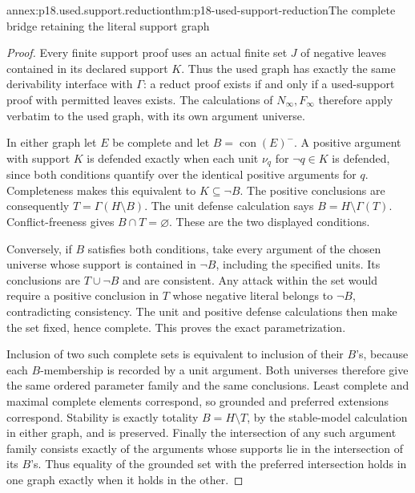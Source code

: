 \begin{annexitem}{annex:p18.used.support.reduction}{thm:p18-used-support-reduction}{The complete bridge retaining the literal support graph}
\begin{proof}
Every finite support proof uses an actual finite set \(J\)
of negative leaves contained in its declared support \(K\).
Thus the used graph has exactly the same derivability
interface with \(\Gamma\): a reduct proof exists if
and only if a used-support proof with permitted leaves
exists. The calculations of \(N_\infty,F_\infty\)
therefore apply verbatim to the used graph, with
its own argument universe.

In either graph let \(E\) be complete and let
\(B=\operatorname{con}(E)^-\). A positive argument
with support \(K\) is defended exactly when each
unit \(\nu_q\) for \(\neg q\in K\) is defended,
since both conditions quantify over the identical
positive arguments for \(q\). Completeness makes
this equivalent to \(K\subseteq\neg B\).
The positive conclusions are consequently
\(T=\Gamma(H\setminus B)\).
The unit defense calculation says
\(B=H\setminus\Gamma(T)\).
Conflict-freeness gives \(B\cap T=\varnothing\).
These are the two displayed conditions.

Conversely, if \(B\) satisfies both conditions,
take every argument of the chosen universe whose
support is contained in \(\neg B\), including
the specified units. Its conclusions are
\(T\cup\neg B\) and are consistent.
Any attack within the set would require a
positive conclusion in \(T\) whose negative
literal belongs to \(\neg B\), contradicting
consistency. The unit and positive defense
calculations then make the set fixed, hence
complete. This proves the exact parametrization.

Inclusion of two such complete sets is equivalent
to inclusion of their \(B\)'s, because each
\(B\)-membership is recorded by a unit argument.
Both universes therefore give the same ordered
parameter family and the same conclusions.
Least complete and maximal complete elements
correspond, so grounded and preferred extensions
correspond. Stability is exactly totality
\(B=H\setminus T\), by the stable-model
calculation in either graph, and is preserved.
Finally the intersection of any such argument
family consists exactly of the arguments whose
supports lie in the intersection of its \(B\)'s.
Thus equality of the grounded set with the
preferred intersection holds in one graph
exactly when it holds in the other.
\end{proof}
\end{annexitem}

